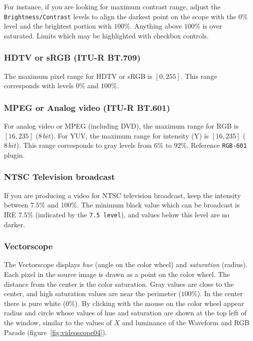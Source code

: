 For instance, if you are looking for maximum contrast range, adjust the \texttt{Brightness/Contrast} levels to align the darkest point on the scope with the $0\%$ level and the brightest portion with $100\%$. Anything above $100\%$ is over saturated. Limits which may be highlighted with checkbox controls.

\subsubsection*{HDTV or sRGB (ITU-R BT.709)}%
\label{ssub:hdtv_srgb_bt709}

The maximum pixel range for HDTV or sRGB is $[0, 255]$. This range corresponds with levels $0\%$ and $100\%$.

\subsubsection*{MPEG or Analog video (ITU-R BT.601)}%
\label{ssub:mpeg_analog_video_bt601}

For analog video or MPEG (including DVD), the maximum range for RGB is $[16, 235]$ ($8\, bit$). For YUV, the maximum range for intensity (Y) is $[16, 235]$ ($8\, bit$). This range corresponds to gray levels from $6\%$ to $92\%$. Reference \texttt{RGB-601} plugin.

\subsubsection*{NTSC Television broadcast}%
\label{ssub:ntsc_television_broadcast}

If you are producing a video for NTSC television broadcast, keep the intensity between $7.5\%$ and $100\%$. The minimum black value which can be broadcast is IRE $7.5\%$ (indicated by the \texttt{7.5 level}), and values below this level are no darker.

\subsubsection*{Vectorscope}%
\label{ssub:Vectorscope}

The Vectorscope displays \textit{hue} (angle on the color wheel) and \textit{saturation} (radius). Each pixel in the source image is drawn as a point on the color wheel. The distance from the center is the color saturation. Gray values are close to the center, and high saturation values are near the perimeter ($100\%$). In the center there is pure white ($0\%$). By clicking with the mouse on the color wheel appear radius and circle whose values of hue and saturation are shown at the top left of the window, similar to the values of $X$ and luminance of the Waveform and RGB Parade (figure~\ref{fig:videoscope04}).

